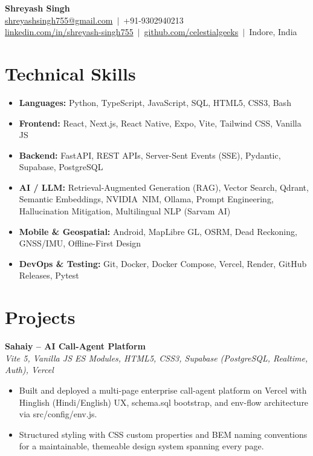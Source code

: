 \documentclass[letterpaper,11pt]{article}
\begin{document}
\begin{center}
  {\LARGE \bfseries Shreyash Singh}\\[3pt]
  \href{mailto:shreyashsingh755@gmail.com}{shreyashsingh755@gmail.com} \,$|$\, +91-9302940213 \\
  \href{https://linkedin.com/in/shreyash-singh755}{linkedin.com/in/shreyash-singh755} \,$|$\,
  \href{https://github.com/celestialgeeks}{github.com/celestialgeeks} \,$|$\, Indore, India
\end{center}

\section{Technical Skills}
\begin{itemize}
  \item \textbf{Languages:} Python, TypeScript, JavaScript, SQL, HTML5, CSS3, Bash
  \item \textbf{Frontend:} React, Next.js, React Native, Expo, Vite, Tailwind CSS, Vanilla JS
  \item \textbf{Backend:} FastAPI, REST APIs, Server-Sent Events (SSE), Pydantic, Supabase, PostgreSQL
  \item \textbf{AI / LLM:} Retrieval-Augmented Generation (RAG), Vector Search, Qdrant, Semantic Embeddings, NVIDIA~NIM,
        Ollama, Prompt Engineering, Hallucination Mitigation, Multilingual NLP (Sarvam AI)
  \item \textbf{Mobile \& Geospatial:} Android, MapLibre GL, OSRM, Dead Reckoning, GNSS/IMU, Offline-First Design
  \item \textbf{DevOps \& Testing:} Git, Docker, Docker Compose, Vercel, Render, GitHub Releases, Pytest
\end{itemize}

\section{Projects}
\textbf{Sahaiy -- AI Call-Agent Platform} \\
\hspace*{0.15in}\textit{Vite 5, Vanilla JS ES Modules, HTML5, CSS3, Supabase (PostgreSQL, Realtime, Auth), Vercel}
\begin{itemize}[leftmargin=0.32in,labelsep=0.45em,itemsep=1pt,topsep=2pt,partopsep=0pt,parsep=0pt]
  \item Built and deployed a multi-page enterprise call-agent platform on Vercel with Hinglish
        (Hindi/English) UX, schema.sql bootstrap, and env-flow architecture via src/config/env.js.
  \item Structured styling with CSS custom properties and BEM naming conventions for a maintainable,
        themeable design system spanning every page.
\end{itemize}
\end{document}
